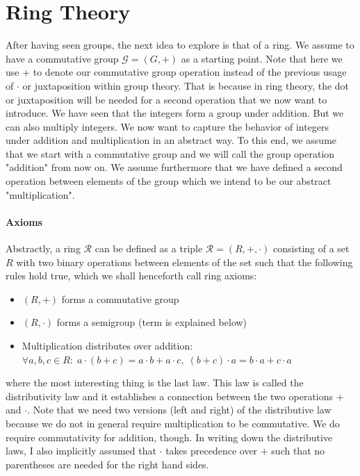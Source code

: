 \label{Sec:RingTheory}
\section{Ring Theory}
After having seen groups, the next idea to explore is that of a ring. We assume to have a commutative group $\mathcal{G} = (G, +)$ as a starting point. Note that here we use $+$ to denote our commutative group operation instead of the previous usage of $\cdot$ or juxtaposition within group theory. That is because in ring theory, the dot or juxtaposition will be needed for a second operation that we now want to introduce. We have seen that the integers form a group under addition. But we can also multiply integers. We now want to capture the behavior of integers under addition and multiplication in an abstract way. To this end, we assume that we start with a commutative group and we will call the group operation "addition" from now on. We assume furthermore that we have defined a second operation between elements of the group which we intend to be our abstract "multiplication". 

\paragraph{Axioms}
Abstractly, a ring $\mathcal{R}$ can be defined as a triple $\mathcal{R} = (R,+,\cdot)$ consisting of a set $R$ with two binary operations between elements of the set such that the following rules hold true, which we shall henceforth call ring axioms:
\begin{itemize}
\item $(R,+)$ forms a commutative group
\item $(R,\cdot)$ forms a semigroup (term is explained below)
\item Multiplication distributes over addition: 
$\forall a,b,c \in R: \;  
a \cdot (b + c) = a \cdot b + a \cdot c, \; 
(b + c) \cdot a = b \cdot a + c \cdot a$
\end{itemize}
where the most interesting thing is the last law. This law is called the distributivity law and it establishes a connection between the two operations $+$ and $\cdot$. Note that we need two versions (left and right) of the distributive law because we do not in general require multiplication to be commutative. We do require commutativity for addition, though. In writing down the distributive laws, I also implicitly assumed that $\cdot$ takes precedence over $+$ such that no parentheses are needed for the right hand sides.


